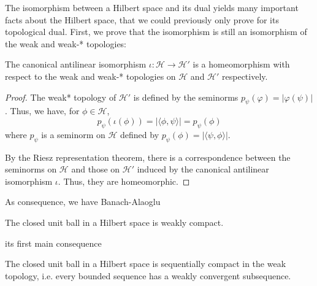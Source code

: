\documentclass[twoside,symmetric, openany, 12pt]{./tuftebook}
\theoremstyle{definition}
\theoremstyle{definition}
\theoremstyle{definition}
\begin{document}
The isomorphism between a Hilbert space and its dual yields many important facts about the Hilbert space, that we could previously only prove for its topological dual. First, we prove that the isomorphism is still an isomorphism of the weak and weak-* topologies:
\begin{Theorem}
	The canonical antilinear isomorphism $\iota: \mathcal{H}\to \mathcal{H}'$ is a homeomorphism with respect to the weak and weak-* topologies on $\mathcal{H}$ and $\mathcal{H}'$ respectively.
\end{Theorem}
\begin{proof}
The weak* topology of $\mathcal{H}'$ is defined by the seminorms $p_\psi(\varphi) = |\varphi(\psi)|$. Thus, we have, for $\phi\in \mathcal{H}$,
\[
p_\psi(\iota(\phi)) = |\langle \phi, \psi\rangle| = p_\psi(\phi)
\]
where $p_\psi$ is a seminorm on $\mathcal{H}$ defined by $p_\psi(\phi) = |\langle \psi, \phi\rangle |$. 

By the Riesz representation theorem, there is a correspondence between the seminorms on $\mathcal{H}$ and those on $\mathcal{H}'$ induced by the canonical antilinear isomorphism $\iota$. Thus, they are homeomorphic.
\end{proof}
As consequence, we have Banach-Alaoglu
\begin{Corollary}
	The closed unit ball in a Hilbert space is weakly compact.
\end{Corollary}
its first main consequence
\begin{Corollary}
	The closed unit ball in a Hilbert space is sequentially compact in the weak topology, i.e. every bounded sequence has a weakly convergent subsequence.
\end{Corollary}
\end{document}
